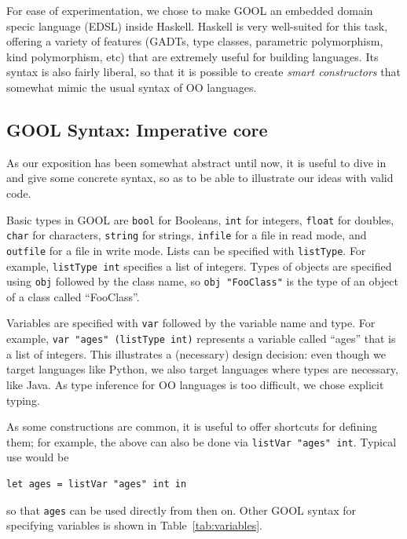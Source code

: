 \documentclass[sigplan,review,anonymous,prologue,dvipsnames]{acmart}
\begin{document}
For ease of experimentation, we chose to make GOOL an embedded
domain specic language (EDSL) inside Haskell.  Haskell is very well-suited
for this task, offering a variety of features (GADTs, type classes,
parametric polymorphism, kind polymorphism, etc) that are extremely useful
for building languages.  Its syntax is also fairly liberal, so that it is
possible to create \emph{smart constructors} that somewhat mimic the
usual syntax of OO languages.

\subsection{GOOL Syntax: Imperative core} \label{ssec:syntax}

As our exposition has been somewhat abstract until now, it is useful to
dive in and give some concrete syntax, so as to be able to illustrate
our ideas with valid code.

Basic types in GOOL are \verb|bool| for Booleans,
\verb|int| for integers, \verb|float| for doubles, \verb|char|
for characters, \verb|string| for strings, \verb|infile| for a file
in read mode, and \verb|outfile| for a file in write mode. Lists can be
specified with \verb|listType|. For example, \verb|listType int|
specifies a list of integers. Types of objects are specified using
\verb|obj| followed by the class name, so \verb|obj "FooClass"| is the type of
an object of a class called ``FooClass''.

Variables are specified with \verb|var| followed by the variable name and type.
For example, \verb|var "ages" (listType int)| represents a variable called
``ages'' that is a list of integers. This illustrates a (necessary) design
decision: even though we target languages like Python, we also target languages
where types are necessary, like Java. As type inference for OO languages is too
difficult, we chose explicit typing.

As some constructions are common, it is useful to offer shortcuts for
defining them; for example, the above can also be done via
\verb|listVar "ages" int|. Typical use would be
\begin{lstlisting}
let ages = listVar "ages" int in
\end{lstlisting}
so that \verb|ages| can be used directly from then on. Other GOOL syntax for
specifying variables is shown in Table~\ref{tab:variables}.
\end{document}

